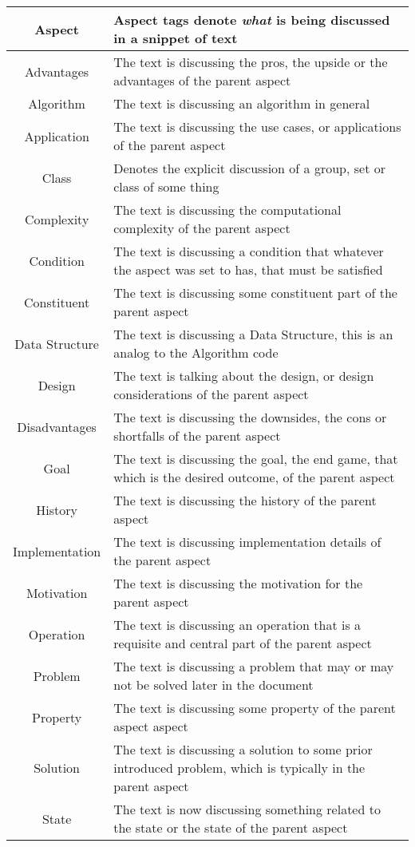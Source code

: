 \begin{table}[h!]
\begin{tabular}{c p{1.8\linewidth}}
    
    \textbf{Aspect} & Aspect tags denote \emph{what} is being discussed in a snippet of text \\
    \hline
    Advantages & The text is discussing the pros, the upside or the advantages of the parent aspect \\
    Algorithm & The text is discussing an algorithm in general \\
    Application &  The text is discussing the use cases, or applications of the parent aspect\\
    Class & Denotes the explicit discussion of a group, set or class of some thing\\
    Complexity & The text is discussing the computational complexity of the parent aspect\\
    Condition & The text is discussing a condition that whatever the aspect was set to has, that must be satisfied\\
    Constituent & The text is discussing some constituent part of the parent aspect\\
    Data Structure & The text is discussing a Data Structure, this is an analog to the Algorithm code\\
    Design & The text is talking about the design, or design considerations of the parent aspect\\
    Disadvantages & The text is discussing the downsides, the cons or shortfalls of the parent aspect\\
    Goal & The text is discussing the goal, the end game, that which is the desired outcome, of the parent aspect\\
    History & The text is discussing the history of the parent aspect\\
    Implementation & The text is discussing implementation details of the parent aspect\\
    Motivation & The text is discussing the motivation for the parent aspect\\
    Operation & The text is discussing an operation that is a requisite and central part of the parent aspect\\
    Problem & The text is discussing a problem that may or may not be solved later in the document\\
    Property & The text is discussing some property of the parent aspect aspect\\
    Solution & The text is discussing a solution to some prior introduced problem, which is typically in the parent aspect\\
    State & The text is now discussing something related to the state or the state of the parent aspect\\


\end{tabular}
\end{table}
